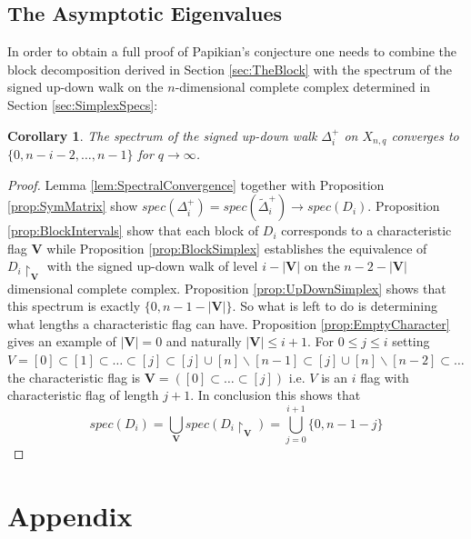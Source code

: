 \documentclass[11pt]{amsart}
\newtheorem{corollary}[theorem]{Corollary}
\begin{document}
    \subsection{The Asymptotic Eigenvalues}
    In  order to obtain a full proof of Papikian's conjecture one needs to combine the block decomposition derived in Section \ref{sec:TheBlock} with the spectrum of the signed up-down walk on the $n$-dimensional complete complex determined in Section \ref{sec:SimplexSpecs}: 
    \begin{corollary}
        The spectrum of the signed up-down walk $\Delta_i^+$ on $X_{n,q}$ converges to $\{0,n-i-2,\dots,n-1\}$ for $q\rightarrow\infty $. 
        \label{thm:Eigenstripping}
    \end{corollary}
    \begin{proof}
        Lemma \ref{lem:SpectralConvergence} together with Proposition \ref{prop:SymMatrix} show $spec(\Delta_i^+)=spec(\tilde{\Delta}_i^+)\rightarrow spec(D_i)$. Proposition \ref{prop:BlockIntervals} show that each block of $D_i$ corresponds to a characteristic flag $\mathbf{V}$ while Proposition \ref{prop:BlockSimplex} establishes the equivalence of $D_i\restriction_{\mathbf{V}}$ with the signed up-down walk of level $i-|\mathbf{V}|$ on the $n-2-|\mathbf{V}|$ dimensional complete complex. Proposition \ref{prop:UpDownSimplex} shows that this spectrum is exactly $\{0, n-1-|\mathbf{V}|\}$. So what is left to do is determining what lengths a characteristic flag can have. Proposition \ref{prop:EmptyCharacter} gives an example of $|\mathbf{V}|=0$ and naturally $|\mathbf{V}|\leq i+1$. For $0\leq j\leq i$ setting $V=[0]\subset[1]\subset\dots\subset[j]\subset [j]\cup[n]\backslash[n-1]\subset [j]\cup[n]\backslash[n-2]\subset\dots $ the characteristic flag is $\mathbf{V}=([0]\subset\dots\subset[j])$ i.e. $V$ is an $i$ flag with characteristic flag of length $j+1$. In conclusion this shows that
        \begin{equation}
            spec(D_i)=\bigcup_{\mathbf{V}}spec(D_i\restriction_{\mathbf{V}})=\bigcup_{j=0}^{i+1}\{0,n-1-j\}
        \end{equation}
    \end{proof}


    \newpage
    \section{Appendix}
\end{document}
